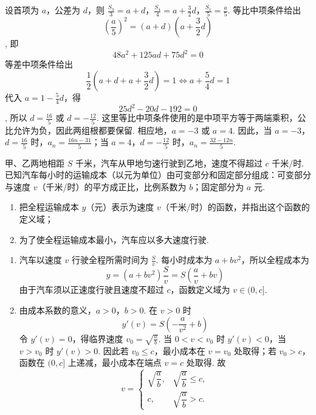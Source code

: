 \documentclass[UTF8,a4paper,oneside,11pt]{ctexbook}
\begin{document}
\begin{solution}
设首项为 \(a\)，公差为 \(d\)，则 \(\frac{S_3}{3}=a+d\)，\(\frac{S_4}{4}=a+\frac32d\)，\(\frac{S_1}{5}=\frac a5\).
等比中项条件给出
\[
\left(\frac a5\right)^2=(a+d)\left(a+\frac32d\right)
\],
即
\[
48a^2+125ad+75d^2=0
\]
等差中项条件给出
\[
\frac12\left(a+d+a+\frac32d\right)=1
\iff a+\frac54d=1
\]
代入 \(a=1-\frac54d\)，得
\[
25d^2-20d-192=0
\],
所以 \(d=\frac{16}{5}\) 或 \(d=-\frac{12}{5}\). 这里等比中项条件使用的是中项平方等于两端乘积，公比允许为负，因此两组根都要保留. 相应地，\(a=-3\) 或 \(a=4\). 因此，当 \(a=-3\)，\(d=\frac{16}{5}\) 时，\(a_n=\frac{16n-31}{5}\)；当 \(a=4\)，\(d=-\frac{12}{5}\) 时，\(a_n=\frac{32-12n}{5}\).
\end{solution}

\begin{problem}
甲、乙两地相距 \(S\) 千米，汽车从甲地匀速行驶到乙地，速度不得超过 \(c\) 千米/时. 已知汽车每小时的运输成本（以元为单位）由可变部分和固定部分组成：可变部分与速度 \(v\)（千米/时）的平方成正比，比例系数为 \(b\)；固定部分为 \(a\) 元.
\begin{enumerate}
\item 把全程运输成本 \(y\)（元）表示为速度 \(v\)（千米/时）的函数，并指出这个函数的定义域；
\item 为了使全程运输成本最小，汽车应以多大速度行驶.
\end{enumerate}
\end{problem}

\begin{solution}
\begin{enumerate}
\item 汽车以速度 \(v\) 行驶全程所需时间为 \(\frac{S}{v}\). 每小时成本为 \(a+bv^2\)，所以全程成本为
\[
y=(a+bv^2)\frac Sv=S\left(\frac av+bv\right)
\]
由于汽车须以正速度行驶且速度不超过 \(c\)，函数定义域为 \(v\in(0,c]\).

\item 由成本系数的意义，\(a>0\)，\(b>0\). 在 \(v>0\) 时
\[
y'(v)=S\left(-\frac a{v^2}+b\right)
\]
令 \(y'(v)=0\)，得临界速度 \(v_0=\sqrt{\frac{a}{b}}\). 当 \(0<v<v_0\) 时 \(y'(v)<0\)，当 \(v>v_0\) 时 \(y'(v)>0\). 因此若 \(v_0\leqslant c\)，最小成本在 \(v=v_0\) 处取得；若 \(v_0>c\)，函数在 \((0,c]\) 上递减，最小成本在端点 \(v=c\) 处取得. 故
\[
v=
\begin{cases}
\sqrt{\dfrac ab},&\sqrt{\dfrac ab}\leqslant c,\\[4pt]
c,&\sqrt{\dfrac ab}>c.
\end{cases}
\]
\end{enumerate}
\end{solution}
\end{document}
